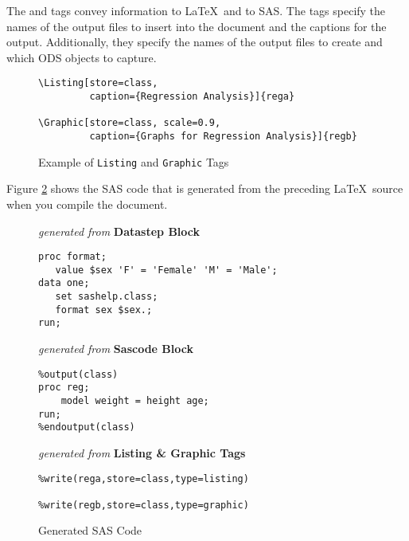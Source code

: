\documentclass[article,oneside]{memoir}
\begin{document}
  The  and  tags convey information to \LaTeX\ and to SAS.
  The tags specify the names of the output files to insert into the document 
  and the captions for the output.
  Additionally, they specify the names of the output files to create and which
  ODS objects to capture.
  
\begin{figure}[H]
\begin{snugshade}
\begin{verbatim}   
\Listing[store=class, 
         caption={Regression Analysis}]{rega}
            
\Graphic[store=class, scale=0.9, 
         caption={Graphs for Regression Analysis}]{regb}
\end{verbatim}
\end{snugshade}
\caption{Example of \texttt{Listing} and \texttt{Graphic} Tags}\label{fig:slg}
\end{figure}
  
  Figure \ref{fig:sgp} shows the SAS code that is generated  
  from the preceding \LaTeX\ source when you compile the document.
  
\begin{figure}[H]
\begin{framed}
\begin{snugshade}
{\hfil\emph{generated from }\textbf{Datastep Block}\hfil}
\begin{verbatim}
proc format;
   value $sex 'F' = 'Female' 'M' = 'Male';
data one;
   set sashelp.class;
   format sex $sex.;
run;
\end{verbatim}
\end{snugshade}
\begin{snugshade}
{\hfil\emph{generated from }\textbf{Sascode Block}\hfil}
\begin{verbatim}
%output(class)
proc reg;
    model weight = height age;
run;
%endoutput(class)
\end{verbatim}
\end{snugshade}
\begin{snugshade}
{\hfil\emph{generated from }\textbf{Listing \& Graphic Tags}\hfil}
\begin{verbatim}
%write(rega,store=class,type=listing) 

%write(regb,store=class,type=graphic) 
\end{verbatim}
\end{snugshade}
\end{framed}
\caption{Generated SAS Code}\label{fig:sgp}
\end{figure}
  
\end{document}

